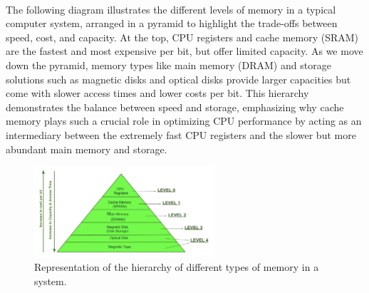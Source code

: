     \paragraph*{}
    The following diagram illustrates the different levels of memory in a typical computer system, arranged in a pyramid to 
    highlight the trade-offs between speed, cost, and capacity. At the top, CPU registers and cache memory (SRAM) 
    are the fastest and most expensive per bit, but offer limited capacity. As we move down the pyramid, memory types 
    like main memory (DRAM) and storage solutions such as magnetic disks and optical disks provide larger capacities 
    but come with slower access times and lower costs per bit. This hierarchy demonstrates the balance between speed 
    and storage, emphasizing why cache memory plays such a crucial role in optimizing CPU performance by acting as 
    an intermediary between the extremely fast CPU registers and the slower but more abundant main memory and storage.

    \begin{figure}[h]
        \begin{center}
            \includegraphics[width=0.6\textwidth]{Figures/herarchy.png}
        \end{center}
        \caption{Representation of the hierarchy of different types of memory in a system.}
        \label{}
    \end{figure}

\newpage
